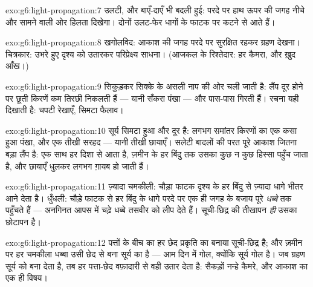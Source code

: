 \begin{solution}{exo:g6:light-propagation:7}
उलटी, और बाएँ-दाएँ भी बदली हुई: परदे पर हाथ ऊपर की जगह नीचे और सामने
वाली ओर हिलता दिखेगा। दोनों उलट-फेर धागों के फाटक पर कटने से आते हैं।
\end{solution}

\begin{solution}{exo:g6:light-propagation:8}
खगोलविद: आकाश की जगह परदे पर सुरक्षित रहकर ग्रहण देखना। चित्रकार:
उभरे हुए दृश्य को उतारकर परिप्रेक्ष्य साधना। (आजकल के रिश्तेदार: हर
कैमरा, और ख़ुद आँख।)
\end{solution}

\begin{solution}{exo:g6:light-propagation:9}
 सिकुड़कर सिक्के के असली नाप की ओर चली जाती है: लैंप दूर होने पर
छूती किरणें कम तिरछी निकलती हैं --- यानी सँकरा पंखा --- और पास-पास
गिरती हैं। रचना यही दिखाती है: चपटी रेखाएँ, सिमटा फैलाव।
\end{solution}

\begin{solution}{exo:g6:light-propagation:10}
सूर्य सिमटा हुआ और दूर है: लगभग समांतर किरणों का एक कसा हुआ पंखा, और
एक तीखी सरहद --- यानी तीखी छायाएँ। सलेटी बादलों की परत पूरे आकाश जितना
बड़ा लैंप है:  एक साथ हर दिशा से आता है, ज़मीन के हर बिंदु तक
उसका कुछ न कुछ हिस्सा पहुँच जाता है, और छायाएँ धुलकर लगभग ग़ायब हो
जाती हैं।
\end{solution}

\begin{solution}{exo:g6:light-propagation:11}
ज़्यादा चमकीली: चौड़ा फाटक दृश्य के हर बिंदु से ज़्यादा धागे भीतर आने
देता है। धुँधली: चौड़े फाटक से हर बिंदु के धागे परदे पर एक ही जगह के
बजाय पूरे \emph{धब्बे} तक पहुँचते हैं --- अनगिनत आपस में चढ़े धब्बे
तसवीर को लीप देते हैं। सूची-छिद्र की तीखापन \emph{ही} उसका छोटापन है।
\end{solution}

\begin{solution}{exo:g6:light-propagation:12}
पत्तों के बीच का हर छेद प्रकृति का बनाया सूची-छिद्र है; और ज़मीन पर
हर चमकीला धब्बा उसी छेद से बना सूर्य का  है --- आम दिन में
गोल, क्योंकि सूर्य गोल है। जब ग्रहण सूर्य को  बना देता है, तब
हर पत्ता-छेद वफ़ादारी से वही  उतार देता है: सैकड़ों नन्हे
कैमरे, और आकाश का एक ही विषय।
\end{solution}

